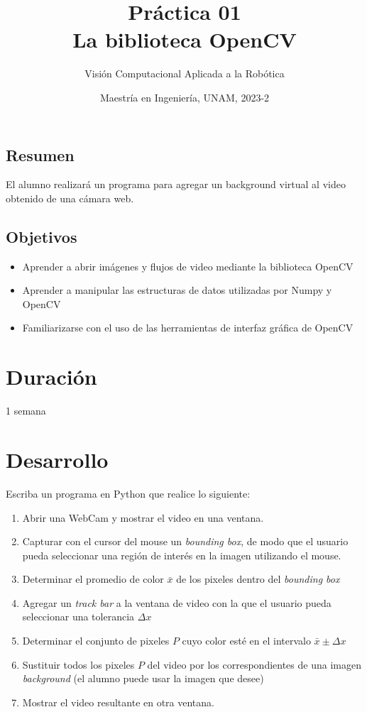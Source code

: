 \documentclass[letterpaper,11pt]{article}
\title{Práctica 01\\La biblioteca OpenCV}
\author{Visión Computacional Aplicada a la Robótica}
\date{Maestría en Ingeniería, UNAM, 2023-2}
\begin{document}
\renewcommand{\tablename}{Tabla}

\maketitle

\subsection*{Resumen}
El alumno realizará un programa para agregar un background virtual al video obtenido de una cámara web. 

\subsection*{Objetivos}
\begin{itemize}
\item Aprender a abrir imágenes y flujos de video mediante la biblioteca OpenCV
\item Aprender a manipular las estructuras de datos utilizadas por Numpy y OpenCV
\item Familiarizarse con el uso de las herramientas de interfaz gráfica de OpenCV
\end{itemize}

\section*{Duración}
1 semana

\section*{Desarrollo}
Escriba un programa en Python que realice lo siguiente:
\begin{enumerate}
\item Abrir una WebCam y mostrar el video en una ventana.
\item Capturar con el cursor del mouse un \textit{bounding box}, de modo que el usuario pueda seleccionar una región de interés en la imagen utilizando el mouse.
\item Determinar el promedio de color $\bar{x}$ de los pixeles dentro del \textit{bounding box}
\item Agregar un \textit{track bar} a la ventana de video con la que el usuario pueda seleccionar una tolerancia $\Delta x$
\item Determinar el conjunto de pixeles $P$ cuyo color esté en el intervalo $\bar{x} \pm \Delta x$
\item Sustituir todos los pixeles $P$ del video por los correspondientes de una imagen \textit{background} (el alumno puede usar la imagen que desee)
\item Mostrar el video resultante en otra ventana.
\end{enumerate}
\end{document}

